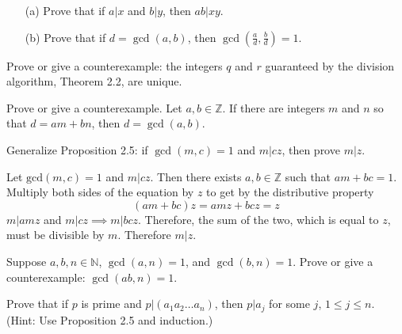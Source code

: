   \begin{exercise}[Shifrin 1.2.4]
    \begin{enumerate}
      \item[(a)] Prove that if $a|x$ and $b|y$, then $ab|xy$.
      \item[(b)] Prove that if $d = \gcd(a, b)$, then $\gcd(\frac{a}{d}, \frac{b}{d}) = 1$.
    \end{enumerate}
  \end{exercise}

  \begin{exercise}[Shifrin 1.2.5]
    Prove or give a counterexample: the integers $q$ and $r$ guaranteed by the division algorithm, Theorem 2.2, are unique.
  \end{exercise}

  \begin{exercise}[Shifrin 1.2.6]
     Prove or give a counterexample. Let $a, b \in \mathbb{Z}$. If there are integers $m$ and $n$ so that $d = am + bn$, then $d = \gcd(a, b)$.
  \end{exercise}

  \begin{exercise}[Shifrin 1.2.7]
    Generalize Proposition 2.5: if $\gcd(m, c) = 1$ and $m|cz$, then prove $m|z$.
  \end{exercise}
  \begin{solution}
    Let $\mathrm{gcd}(m, c) = 1$ and $m | cz$. Then there exists $a, b \in \mathbb{Z}$ such that $am + bc = 1$. Multiply both sides of the equation by $z$ to get by the distributive property 
    \begin{equation}
      (am + bc) z = amz + bcz = z
    \end{equation} 
    $m | amz$ and $m | cz \implies m | bcz$. Therefore, the sum of the two, which is equal to $z$, must be divisible by $m$. Therefore $m | z$. 
  \end{solution}

  \begin{exercise}[Shifrin 1.2.8]
    Suppose $a, b, n \in \mathbb{N}$, $\gcd(a, n) = 1$, and $\gcd(b, n) = 1$. Prove or give a counterexample: $\gcd(ab, n) = 1$.
  \end{exercise}

  \begin{exercise}[Shifrin 1.2.9]
    Prove that if $p$ is prime and $p|(a_1 a_2 \ldots a_n)$, then $p|a_j$ for some $j$, $1 \leq j \leq n$. (Hint: Use Proposition 2.5 and induction.)
  \end{exercise}

